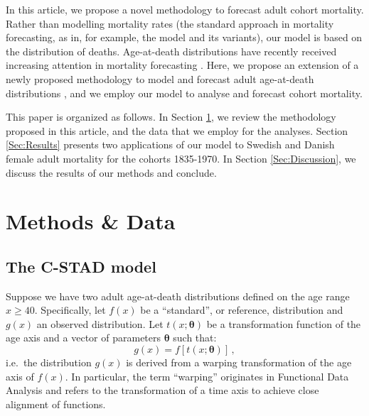 \documentclass[11pt, a4paper]{article}
\begin{document}
In this article, we propose a novel methodology to forecast adult cohort mortality. Rather than modelling mortality rates (the standard approach in mortality forecasting, as in, for example, the \citeauthor{lee1992modeling} model and its variants), our model is based on the distribution of deaths. Age-at-death distributions have recently received increasing attention in mortality forecasting \citep{oeppen2008coherent,bergeron2017coherent,basellini2019modeling,pascariu2019maximum}. Here, we propose an extension of a newly proposed methodology to model and forecast adult age-at-death distributions \citep{basellini2019modeling}, and we employ our model to analyse and forecast cohort mortality. \par 
 
This paper is organized as follows. In Section \ref{Sec:Methods}, we review the methodology proposed in this article, and the data that we employ for the analyses. Section \ref{Sec:Results} presents two applications of our model to Swedish and Danish female adult mortality for the cohorts 1835-1970. In Section \ref{Sec:Discussion}, we discuss the results of our methods and conclude. 

\section{Methods \& Data}
\label{Sec:Methods}
\subsection{The C-STAD model}
\label{Subsec:C-STADmodel}
Suppose we have two adult age-at-death distributions defined on the age range $x \geq 40$. Specifically, let $f(x)$ be a ``standard'', or reference, distribution and $g(x)$ an observed distribution. Let $t(x;\bm{\theta})$ be a transformation function of the age axis and a vector of parameters $\bm{\theta}$ such that:
\begin{equation}\label{Eq:gxftx}
g(x) = f\left[t(x;\bm{\theta})\right]\,, 
\end{equation}  
i.e.~the distribution $g(x)$ is derived from a warping transformation of the age axis of $f(x)$. In particular, the term ``warping'' originates in Functional Data Analysis \citep{ramsay2005FDA} and refers to the transformation of a time axis to achieve close alignment of functions. \par
\end{document}
